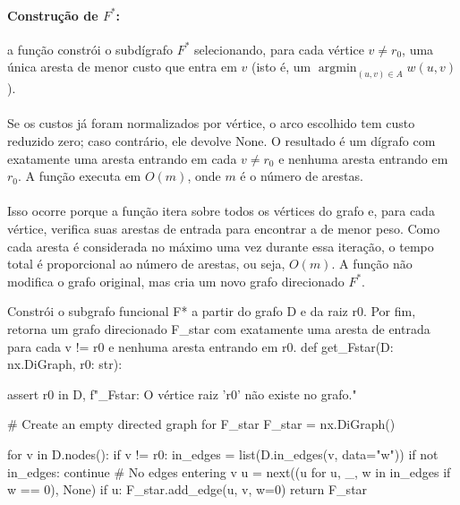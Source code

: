 \documentclass[12pt,a4paper]{article}
\begin{document}
\paragraph{Construção de \(F^*\):}
a função constrói o subdígrafo \(F^*\) selecionando, para cada vértice \(v\neq r_0\), uma única aresta de menor custo que entra em \(v\) (isto é, um \(\operatorname*{argmin}_{(u,v)\in A} w(u,v)\)).

\paragraph{}
Se os custos já foram normalizados por vértice, o arco escolhido tem custo reduzido zero; caso contrário, ele devolve None. O resultado é um dígrafo com exatamente uma aresta entrando em cada \(v\neq r_0\) e nenhuma aresta entrando em \(r_0\). A função executa em \(O(m)\), onde \(m\) é o número de arestas.

\paragraph{}
Isso ocorre porque a função itera sobre todos os vértices do grafo e, para cada vértice, verifica suas arestas de entrada para encontrar a de menor peso. Como cada aresta é considerada no máximo uma vez durante essa iteração, o tempo total é proporcional ao número de arestas, ou seja, \(O(m)\). A função não modifica o grafo original, mas cria um novo grafo direcionado \(F^*\).

\begin{pybox}[title={Construção de $F^*$},colback=blue!5!white,colframe=blue!75!black]{Constrói o subgrafo funcional F* a partir do grafo D e da raiz r0. Por fim, retorna um grafo direcionado F_star com exatamente uma aresta de entrada para cada v != r0 e nenhuma aresta entrando em r0.}
def get_Fstar(D: nx.DiGraph, r0: str):
    
    assert r0 in D, f"\nget_Fstar: O vértice raiz '{r0}' não existe no grafo."

    # Create an empty directed graph for F_star
    F_star = nx.DiGraph()

    for v in D.nodes():
        if v != r0:
            in_edges = list(D.in_edges(v, data="w"))
            if not in_edges:
                continue  # No edges entering v
            u = next((u for u, _, w in in_edges if w == 0), None)
            if u:
                F_star.add_edge(u, v, w=0)
    return F_star
\end{pybox}
\end{document}
